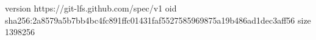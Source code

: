 version https://git-lfs.github.com/spec/v1
oid sha256:2a8579a5b7bb4bc4fc891ffc01431faf5527585969875a19b486ad1dec3aff56
size 1398256

